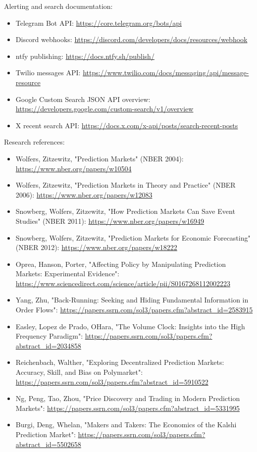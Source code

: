 \documentclass[
]{article}
\providecommand{\tightlist}{%
  \setlength{\itemsep}{0pt}\setlength{\parskip}{0pt}}
\begin{document}
Alerting and search documentation:

\begin{itemize}
\tightlist
\item
  Telegram Bot API: \url{https://core.telegram.org/bots/api}
\item
  Discord webhooks:
  \url{https://discord.com/developers/docs/resources/webhook}
\item
  ntfy publishing: \url{https://docs.ntfy.sh/publish/}
\item
  Twilio messages API:
  \url{https://www.twilio.com/docs/messaging/api/message-resource}
\item
  Google Custom Search JSON API overview:
  \url{https://developers.google.com/custom-search/v1/overview}
\item
  X recent search API:
  \url{https://docs.x.com/x-api/posts/search-recent-posts}
\end{itemize}

Research references:

\begin{itemize}
\tightlist
\item
  Wolfers, Zitzewitz, "Prediction Markets" (NBER 2004):
  \url{https://www.nber.org/papers/w10504}
\item
  Wolfers, Zitzewitz, "Prediction Markets in Theory and Practice" (NBER
  2006): \url{https://www.nber.org/papers/w12083}
\item
  Snowberg, Wolfers, Zitzewitz, "How Prediction Markets Can Save Event
  Studies" (NBER 2011): \url{https://www.nber.org/papers/w16949}
\item
  Snowberg, Wolfers, Zitzewitz, "Prediction Markets for Economic
  Forecasting" (NBER 2012): \url{https://www.nber.org/papers/w18222}
\item
  Oprea, Hanson, Porter, "Affecting Policy by Manipulating Prediction
  Markets: Experimental Evidence":
  \url{https://www.sciencedirect.com/science/article/pii/S0167268112002223}
\item
  Yang, Zhu, "Back-Running: Seeking and Hiding Fundamental Information
  in Order Flows":
  \url{https://papers.ssrn.com/sol3/papers.cfm?abstract_id=2583915}
\item
  Easley, Lopez de Prado, O\textquotesingle Hara, "The Volume Clock:
  Insights into the High Frequency Paradigm":
  \url{https://papers.ssrn.com/sol3/papers.cfm?abstract_id=2034858}
\item
  Reichenbach, Walther, "Exploring Decentralized Prediction Markets:
  Accuracy, Skill, and Bias on Polymarket":
  \url{https://papers.ssrn.com/sol3/papers.cfm?abstract_id=5910522}
\item
  Ng, Peng, Tao, Zhou, "Price Discovery and Trading in Modern Prediction
  Markets":
  \url{https://papers.ssrn.com/sol3/papers.cfm?abstract_id=5331995}
\item
  Burgi, Deng, Whelan, "Makers and Takers: The Economics of the Kalshi
  Prediction Market":
  \url{https://papers.ssrn.com/sol3/papers.cfm?abstract_id=5502658}
\end{itemize}
\end{document}
